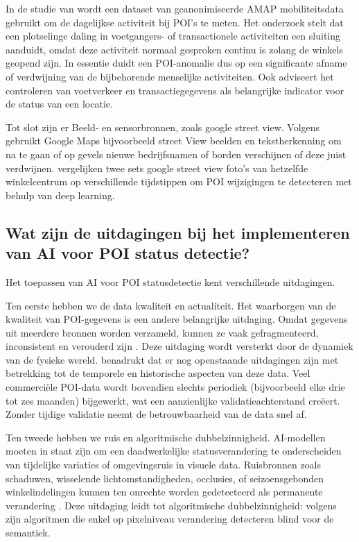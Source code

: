  In de studie van \textcite{Yao2024} wordt een dataset van geanonimiseerde AMAP mobiliteitsdata gebruikt om de dagelijkse activiteit bij POI’s te meten. Het onderzoek stelt dat een plotselinge daling in voetgangers- of transactionele activiteiten een sluiting aanduidt, omdat deze activiteit normaal gesproken continu is zolang de winkels geopend zijn. In essentie duidt een POI-anomalie dus op een significante afname of verdwijning van de bijbehorende menselijke activiteiten. Ook \textcite{Taylor2022} adviseert het controleren van voetverkeer en transactiegegevens als belangrijke indicator voor de status van een locatie.

Tot slot zijn er Beeld- en sensorbronnen, zoals google street view. Volgens \textcite{Pericolosi2022} gebruikt Google Maps bijvoorbeeld street View beelden en tekstherkenning om na te gaan of op gevels nieuwe bedrijfsnamen of borden verschijnen of deze juist verdwijnen. \textcite{Revaud2019} vergelijken twee sets google street view foto’s van hetzelfde winkelcentrum op verschillende tijdstippen om POI wijzigingen te detecteren met behulp van deep learning. 

\subsection{Wat zijn de uitdagingen bij het implementeren van AI voor POI status detectie?}
Het toepassen van AI voor POI statusdetectie kent verschillende uitdagingen.  

Ten eerste hebben we de data kwaliteit en actualiteit. Het waarborgen van de kwaliteit van POI-gegevens is een andere belangrijke uitdaging. Omdat gegevens uit meerdere bronnen worden verzameld, kunnen ze vaak gefragmenteerd, inconsistent en verouderd zijn \autocite{Rafaqat2023}. Deze uitdaging wordt versterkt door de dynamiek van de fysieke wereld. \textcite{Fernandes2020} benadrukt dat er nog openstaande uitdagingen zijn met betrekking tot de temporele en historische aspecten van deze data. Veel commerciële POI-data wordt bovendien slechts periodiek (bijvoorbeeld elke drie tot zes maanden) bijgewerkt, wat een aanzienlijke validatieachterstand creëert. Zonder tijdige validatie neemt de betrouwbaarheid van de data snel af.

Ten tweede hebben we ruis en algoritmische dubbelzinnigheid. AI-modellen moeten in staat zijn om een daadwerkelijke statusverandering te onderscheiden van tijdelijke variaties of omgevingsruis in visuele data. Ruisbronnen zoals schaduwen, wisselende lichtomstandigheden, occlusies, of seizoensgebonden winkelindelingen kunnen ten onrechte worden gedetecteerd als permanente verandering \autocite{Revaud2019}. Deze uitdaging leidt tot algoritmische dubbelzinnigheid: volgens \textcite{Revaud2019} zijn algoritmen die enkel op pixelniveau verandering detecteren blind voor de semantiek.

